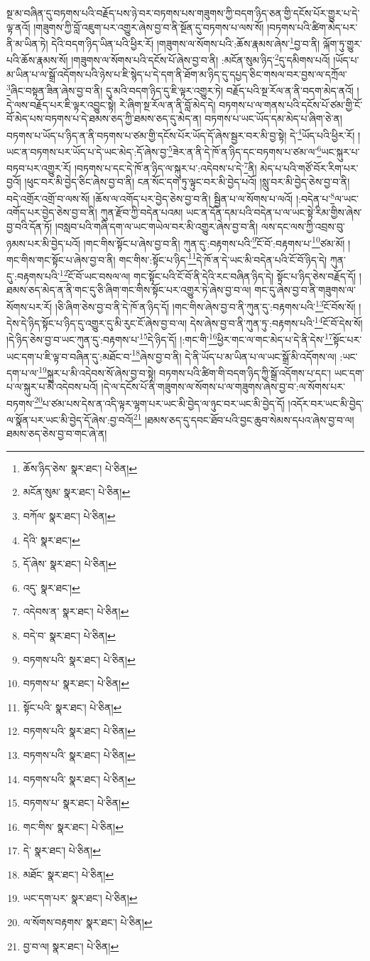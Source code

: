 སྔ་མ་བཞིན་དུ་བཏགས་པའི་བརྗོད་པས་ཉེ་བར་བཏགས་པས་གཟུགས་ཀྱི་བདག་ཉིད་ཅན་གྱི་དངོས་པོར་གྱུར་པ་དེ་ལྟ་ནའོ། །གཟུགས་ཀྱི་བློ་འཇུག་པར་འགྱུར་ཞེས་བྱ་བ་ནི་སྔོན་དུ་བཏགས་པ་ལས་སོ། །བཏགས་པའི་ཚིག་མེད་པར་ནི་མ་ཡིན་ཏེ། དེའི་བདག་ཉིད་ཡིན་པའི་ཕྱིར་རོ། །གཟུགས་ལ་སོགས་པའི་:ཆོས་རྣམས་ཞེས་\footnote{ཆོས་ཉིད་ཅེས་  སྣར་ཐང་།  པེ་ཅིན། }བྱ་བ་ནི། ལྐོག་ཏུ་གྱུར་པའི་ཆོས་རྣམས་སོ། །གཟུགས་ལ་སོགས་པའི་དངོས་པོ་ཞེས་བྱ་བ་ནི། :མངོན་སུམ་ཉིད་\footnote{མངོན་སུམ་  སྣར་ཐང་།  པེ་ཅིན། }དུ་དམིགས་པའོ། །ཡོད་པ་མ་ཡིན་པ་ལ་སྒྲོ་འདོགས་པའི་ཉེས་པ་ཇི་སྙེད་པ་དེ་དག་ནི་ཐོག་མ་ཉིད་དུ་དཔྱད་ཅིང་གསལ་བར་བྱས་ལ་དཀྲོལ་\footnote{བཀོལ་  སྣར་ཐང་།  པེ་ཅིན། }ཞིང་བསྟན་ཟིན་ཞེས་བྱ་བ་ནི། དུ་མའི་བདག་ཉིད་དུ་ཇི་ལྟར་འགྱུར་ཏེ། བརྗོད་པའི་སྔ་རོལ་ན་ནི་བདག་མེད་ནའོ། །དེ་ལས་བརྗོད་པར་ཇི་ལྟར་འབྱུང་སྟེ། རེ་ཞིག་སྔ་རོལ་ན་ནི་བློ་མེད་དེ། བཏགས་པ་ལ་གནས་པའི་དངོས་པོ་ཙམ་གྱི་ངོ་བོ་མེད་པས་བཏགས་པ་དེ་ཐམས་ཅད་ཀྱི་ཐམས་ཅད་དུ་མེད་ན། བཏགས་པ་ཡང་ཡོད་དམ་མེད་པ་ཞིག་ཅེ་ན། བཏགས་པ་ཡོད་པ་ཉིད་ན་ནི་བཏགས་པ་ཙམ་གྱི་དངོས་པོར་ཡོད་དོ་ཞེས་སྦྱར་བར་མི་བྱ་སྟེ། དེ་\footnote{དེའི་  སྣར་ཐང་། }ཡོད་པའི་ཕྱིར་རོ། །ཡང་ན་བཏགས་པར་ཡོད་པ་དེ་ཡང་མེད་:དོ་ཞེས་བྱ་\footnote{དོ་ཞེས་  སྣར་ཐང་།  པེ་ཅིན། }ཟེར་ན་ནི་དེ་ཁོ་ན་ཉིད་དང་བཏགས་པ་ཙམ་ལ་\footnote{འདུ་  སྣར་ཐང་། }ཡང་སྐུར་པ་བཏབ་པར་འགྱུར་རོ། །བཏགས་པ་དང་དེ་ཁོ་ན་ཉིད་ལ་སྐུར་པ་:འདེབས་པ་དེ་\footnote{འདེབས་ན་  སྣར་ཐང་།  པེ་ཅིན། }ནི། མེད་པ་པའི་གཙོ་བོར་རིག་པར་བྱའོ། །ཕུང་བར་མི་བྱེད་ཅིང་ཞེས་བྱ་བ་ནི། ངན་སོང་དག་ཏུ་ལྟུང་བར་མི་བྱེད་པའོ། །སླུ་བར་མི་བྱེད་ཅེས་བྱ་བ་ནི། བདེ་འགྲོར་འགྲོ་བ་ལས་སོ། །ཆོས་ལ་འགོད་པར་བྱེད་ཅེས་བྱ་བ་ནི། སྦྱིན་པ་ལ་སོགས་པ་ལའོ། །:བདེན་པ་\footnote{བདེ་བ་  སྣར་ཐང་།  པེ་ཅིན། }ལ་ཡང་འགོད་པར་བྱེད་ཅེས་བྱ་བ་ནི། ཀུན་རྫོབ་ཀྱི་བདེན་པའམ། ཡང་ན་དོན་དམ་པའི་བདེན་པ་ལ་ཡང་སྟེ་རིམ་གྱིས་ཞེས་བྱ་བའི་དོན་ཏོ། །བསླབ་པའི་གཞི་དག་ལ་ཡང་གཡེལ་བར་མི་འགྱུར་ཞེས་བྱ་བ་ནི། ལས་དང་ལས་ཀྱི་འབྲས་བུ་ཉམས་པར་མི་བྱེད་པའོ། །གང་གིས་སྟོང་པ་ཞེས་བྱ་བ་ནི། ཀུན་དུ་:བརྟགས་པའི་\footnote{བཏགས་པའི་  སྣར་ཐང་།  པེ་ཅིན། }ངོ་བོ་:བརྟགས་པ་\footnote{བཏགས་པ་  སྣར་ཐང་།  པེ་ཅིན། }ཙམ་མོ། །གང་གིས་གང་སྟོང་པ་ཞེས་བྱ་བ་ནི། གང་གིས་:སྟོང་པ་ཉིད་\footnote{སྟོང་པའི་  སྣར་ཐང་།  པེ་ཅིན། }དེ་ཁོ་ན་དེ་ཡང་མི་བདེན་པའི་ངོ་བོ་ཉིད་དེ། ཀུན་དུ་:བརྟགས་པའི་\footnote{བཏགས་པའི་  སྣར་ཐང་།  པེ་ཅིན། }ངོ་བོ་ཡང་བསལ་ལ། གང་སྟོང་པའི་ངོ་བོ་ནི་དེའི་རང་བཞིན་ཉིད་དེ། སྟོང་པ་ཉིད་ཅེས་བརྗོད་དོ། །ཐམས་ཅད་མེད་ན་ནི་གང་དུ་ཅི་ཞིག་གང་གིས་སྟོང་པར་འགྱུར་ཏེ་ཞེས་བྱ་བ་ལ། གང་དུ་ཞེས་བྱ་བ་ནི་གཟུགས་ལ་སོགས་པར་རོ། །ཅི་ཞིག་ཅེས་བྱ་བ་ནི་དེ་ཁོ་ན་ཉིད་དོ། །གང་གིས་ཞེས་བྱ་བ་ནི་ཀུན་དུ་:བརྟགས་པའི་\footnote{བཏགས་པའི་  སྣར་ཐང་།  པེ་ཅིན། }ངོ་བོས་སོ། །དེས་དེ་ཉིད་སྟོང་པ་ཉིད་དུ་འགྱུར་དུ་མི་རུང་ངོ་ཞེས་བྱ་བ་ལ། དེས་ཞེས་བྱ་བ་ནི་ཀུན་ཏུ་:བརྟགས་པའི་\footnote{བཏགས་པའི་  སྣར་ཐང་།  པེ་ཅིན། }ངོ་བོ་དེས་སོ། །དེ་ཉིད་ཅེས་བྱ་བ་ཡང་ཀུན་དུ་:བརྟགས་པ་\footnote{བཏགས་པ་  སྣར་ཐང་།  པེ་ཅིན། }དེ་ཉིད་དོ། །:གང་གི་\footnote{གང་གིས་  སྣར་ཐང་།  པེ་ཅིན། }ཕྱིར་གང་ལ་གང་མེད་པ་དེ་ནི་དེས་\footnote{དེ་  སྣར་ཐང་།  པེ་ཅིན། }སྟོང་པར་ཡང་དག་པ་ཇི་ལྟ་བ་བཞིན་དུ་:མཐོང་བ་\footnote{མཐོང་  སྣར་ཐང་།  པེ་ཅིན། }ཞེས་བྱ་བ་ནི། དེ་ནི་ཡོད་པ་མ་ཡིན་པ་ལ་ཡང་སྒྲོ་མི་འདོགས་ལ། :ཡང་དག་པ་ལ་\footnote{ཡང་དག་པར་  སྣར་ཐང་།  པེ་ཅིན། }སྐུར་པ་མི་འདེབས་སོ་ཞེས་བྱ་བ་སྟེ། བཏགས་པའི་ཚིག་གི་བདག་ཉིད་ཀྱི་སྒྲོ་འདོགས་པ་དང་། ཡང་དག་པ་ལ་སྐུར་པ་མི་འདེབས་པའོ། །དེ་ལ་དངོས་པོ་ནི་གཟུགས་ལ་སོགས་པ་ལ་གཟུགས་ཞེས་བྱ་བ་:ལ་སོགས་པར་བཏགས་\footnote{ལ་སོགས་བརྟགས་  སྣར་ཐང་།  པེ་ཅིན། }པ་ཙམ་པས་དེས་ན་འདི་ལྟར་ལྷག་པར་ཡང་མི་བྱེད་ལ་ཉུང་བར་ཡང་མི་བྱེད་དོ། །འདོར་བར་ཡང་མི་བྱེད་ལ་སྣོན་པར་ཡང་མི་བྱེད་དོ་ཞེས་:བྱ་བའོ།\footnote{བྱ་བ་ལ།  སྣར་ཐང་།  པེ་ཅིན། } །ཐམས་ཅད་དུ་དབང་ཐོབ་པའི་བྱང་ཆུབ་སེམས་དཔའ་ཞེས་བྱ་བ་ལ། ཐམས་ཅད་ཅེས་བྱ་བ་གང་ཞེ་ན། 